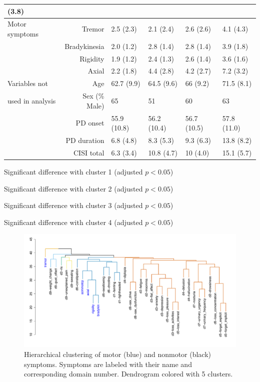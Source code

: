 \documentclass[preprint,5p]{elsarticle} %
\begin{document}
\begin{table}[t]
\begin{threeparttable}
\begin{tabular}{lrllll}
  (3.8)\tnote{1} \\
  \midrule
  Motor symptoms &
  Tremor & 2.5 (2.3) & 2.1 (2.4) & 2.6 (2.6) & 4.1 (4.3) \\
  &Bradykinesia & 2.0 (1.2)\tnote{234} & 2.8 (1.4)\tnote{14} & 2.8 (1.4)\tnote{14} & 3.9 (1.8)\tnote{123} \\
  &Rigidity & 1.9 (1.2)\tnote{234} & 2.4 (1.3)\tnote{14} & 2.6 (1.4)\tnote{14} & 3.6 (1.6)\tnote{123} \\
  &Axial & 2.2 (1.8)\tnote{234} & 4.4 (2.8)\tnote{14} & 4.2 (2.7)\tnote{14} & 7.2 (3.2)\tnote{123} \\
  \midrule
  Variables not & Age & 62.7 (9.9)\tnote{34} & 64.5 (9.6)\tnote{4} & 66 (9.2)\tnote{14} & 71.5
  (8.1)\tnote{123} \\
  used in analysis & Sex (\% Male) & 65\tnote{2} & 51\tnote{1} & 60 & 63 \\
  & PD onset & 55.9 (10.8) & 56.2 (10.4) & 56.7 (10.5) & 57.8 (11.0) \\
  & PD duration & 6.8 (4.8)\tnote{34} & 8.3 (5.3)\tnote{4} & 9.3 (6.3)\tnote{14} & 13.8
  (8.2)\tnote{123} \\
  & CISI total & 6.3 (3.4)\tnote{234} & 10.8 (4.7)\tnote{14} & 10 (4.0)\tnote{14} & 15.1 (5.7)\tnote{123} \\
   \bottomrule
\end{tabular}
  \begin{tablenotes}
    \small
    \item[1] Significant difference with cluster 1 (adjusted $p < 0.05$)
    \item[2] Significant difference with cluster 2 (adjusted $p < 0.05$)
    \item[3] Significant difference with cluster 3 (adjusted $p < 0.05$)
    \item[4] Significant difference with cluster 4 (adjusted $p < 0.05$)
  \end{tablenotes}
  \end{threeparttable}
\end{table}

\begin{figure}[t]
  \centering
  \includegraphics[width=\linewidth]{nms30m-colhc-pub.pdf}
  \caption{Hierarchical clustering of motor (blue) and nonmotor (black) symptoms. Symptoms are
  labeled with their name and corresponding domain number. Dendrogram colored with 5 clusters.}
  \label{fig:hc}
\end{figure}
\end{document}
